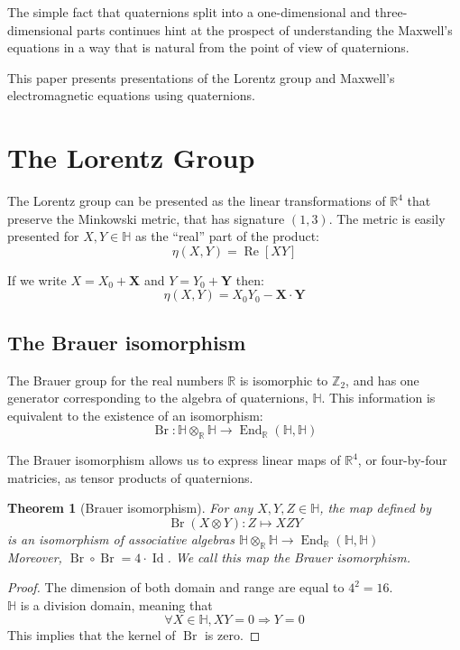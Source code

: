 \documentclass{amsart}
\newcommand{\HH}{\mathbb{H}}
\newcommand{\RR}{\mathbb{R}}
\newcommand{\ZZ}{\mathbb{Z}}
\renewcommand{\Re}{\operatorname{Re}}
\newcommand{\Br}{\operatorname{Br}}
\newcommand{\Id}{\operatorname{Id}}
\newcommand{\End}{\operatorname{End}}
\newtheorem{theorem}{Theorem}
\begin{document}
The simple fact that quaternions split into a one-dimensional and three-dimensional parts continues hint at the prospect of understanding the Maxwell's equations in a way that is natural from the point of view of quaternions.

This paper presents presentations of the Lorentz group and Maxwell's electromagnetic equations using quaternions.


\section{The Lorentz Group}

The Lorentz group can be presented as the linear transformations of $\RR^4$ that preserve the Minkowski metric, that has signature $(1,3)$.
The metric is easily presented for $X,Y \in \HH$ as the ``real'' part of the product:
$$ \eta(X,Y) = \Re[XY]$$

If we write $X = X_0 + \mathbf{X}$ and $Y = Y_0 + \mathbf{Y}$ then:
$$ \eta(X,Y) = X_0Y_0 - \mathbf{X}\cdot \mathbf{Y} $$

\subsection{The Brauer isomorphism}

The Brauer group for the real numbers $\RR$ is isomorphic to $\ZZ_2$, and has one generator corresponding to the algebra of quaternions, $\HH$.
This information is equivalent to the existence of an isomorphism:
$$ \Br : \HH\otimes_\RR\HH \to \End_\RR(\HH, \HH) $$

The Brauer isomorphism allows us to express linear maps of $\RR^4$, or four-by-four matricies, as tensor products of quaternions.

\begin{theorem}[Brauer isomorphism]
  For any $X,Y,Z\in\HH$, the map defined by
$$ \Br(X\otimes Y) : Z \mapsto XZY $$
  is an isomorphism of associative algebras $\HH\otimes_\RR\HH \to \End_\RR(\HH,\HH)$\\
  Moreover, $\Br\circ\Br = 4 \cdot \Id$. We call this map the Brauer isomorphism.
\end{theorem}

\begin{proof}

The dimension of both domain and range are equal to $4^2=16$.\\
$\HH$ is a division domain, meaning that
  $$\forall X\in\HH, XY=0 \Rightarrow Y=0$$
This implies that the kernel of $\Br$ is zero.
\end{proof}
\end{document}
